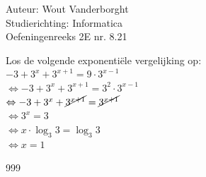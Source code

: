 \documentclass[a4paper]{article}
\begin{document}
  
\noindent \large Auteur: Wout Vanderborght\\
\noindent \large Studierichting: Informatica\\
\noindent \large Oefeningenreeks 2E nr. 8.21\\

\medskip

\normalsize

Los de volgende exponentiële vergelijking op: \\

$ -3 + 3^x + 3^{x+1} = 9 \cdot 3^{x-1} $ \\

$ \Leftrightarrow -3 + 3^x + 3^{x+1} = 3^2 \cdot 3^{x-1} $ \\

$ \Leftrightarrow -3 + 3^x + \cancel{3^{x+1}} = \cancel{3^{x+1}} $ \\

$ \Leftrightarrow 3^x = 3 $ \\

$ \Leftrightarrow x \cdot \log_3 3 = \log_3 3 $ \\

$ \Leftrightarrow x = 1 $ \\

\begin{thebibliography}{999}
\end{thebibliography}
\end{document}
